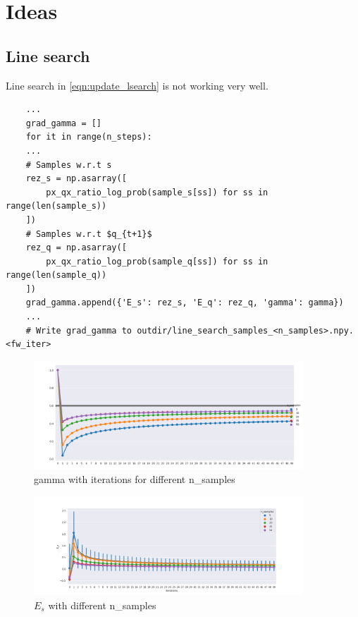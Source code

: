\documentclass[summaries.tex]{subfiles}
\begin{document}
\section{Ideas}
\subsection{Line search}
Line search in \ref{eqn:update_lsearch} is not working very well. 

\begin{verbatim}
    ...
    grad_gamma = []
    for it in range(n_steps):
    ...
    # Samples w.r.t s
    rez_s = np.asarray([
        px_qx_ratio_log_prob(sample_s[ss]) for ss in range(len(sample_s))
    ])
    # Samples w.r.t $q_{t+1}$
    rez_q = np.asarray([
        px_qx_ratio_log_prob(sample_q[ss]) for ss in range(len(sample_q))
    ])
    grad_gamma.append({'E_s': rez_s, 'E_q': rez_q, 'gamma': gamma})
    ...
    # Write grad_gamma to outdir/line_search_samples_<n_samples>.npy.<fw_iter>
\end{verbatim}
\begin{figure}[h] \label{fig:gamma}
  \centering
  \includegraphics[width=0.9\textwidth]{plots/test_gamma.png}
  \caption{gamma with iterations for different n\_samples}
\end{figure}
\begin{figure}[h] \label{fig:es}
  \centering
  \includegraphics[width=0.9\textwidth]{plots/test_e_s.png}
  \caption{$E_s$ with different n\_samples}
\end{figure}
\end{document}
